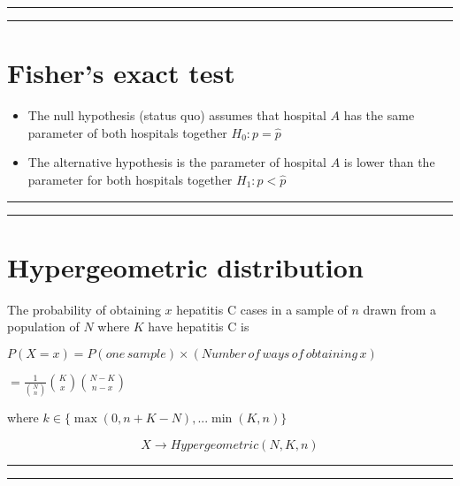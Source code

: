\documentclass[
]{book}
\begin{document}
\begin{center}\rule{0.5\linewidth}{0.5pt}\end{center}

\begin{center}\rule{0.5\linewidth}{0.5pt}\end{center}

\hypertarget{fishers-exact-test-1}{%
\section{Fisher's exact test}\label{fishers-exact-test-1}}

\begin{itemize}
\item
  The null hypothesis (status quo) assumes that hospital \(A\) has the same parameter of both hospitals together \(H_0: p=\hat{p}\)
\item
  The alternative hypothesis is the parameter of hospital \(A\) is lower than the parameter for both hospitals together \(H_1: p < \hat{p}\)
\end{itemize}

\begin{center}\rule{0.5\linewidth}{0.5pt}\end{center}

\begin{center}\rule{0.5\linewidth}{0.5pt}\end{center}

\hypertarget{hypergeometric-distribution}{%
\section{Hypergeometric distribution}\label{hypergeometric-distribution}}

The probability of obtaining \(x\) hepatitis C cases in a sample of \(n\) drawn from a population of \(N\) where \(K\) have hepatitis C is

\(P(X=x)=P(one\,sample) \times (Number\, of\, ways\, of\, obtaining\, x)\)

\(=\frac{1}{\binom N n}\binom K x \binom {N-K} {n-x}\)

where \(k \in \{\max(0, n+K-N), ... \min(K, n) \}\)

\[X \rightarrow Hypergeometric(N,K,n)\]

\begin{center}\rule{0.5\linewidth}{0.5pt}\end{center}

\begin{center}\rule{0.5\linewidth}{0.5pt}\end{center}
\end{document}
